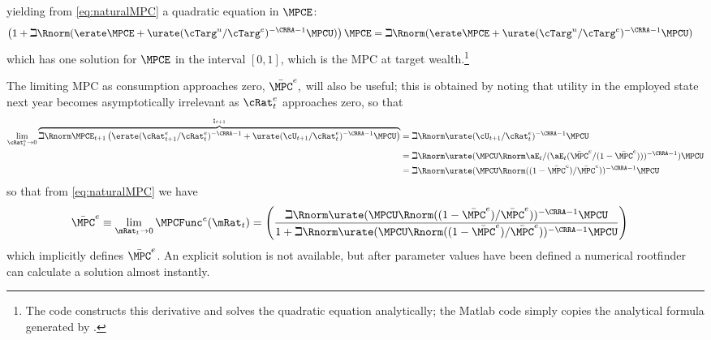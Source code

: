 \documentclass{\handout}
\begin{document}
yielding from \eqref{eq:naturalMPC} a quadratic equation in $\MPCE$:
\begin{equation}\begin{gathered}\begin{aligned}
  \left(1+\beth \Rnorm (\erate \MPCE + \urate (\cTarg^{u}/\cTarg^{e})^{-\CRRA-1}  \MPCU) \right)\MPCE & =  \beth \Rnorm (\erate \MPCE + \urate (\cTarg^{u}/\cTarg^{e})^{-\CRRA-1} \MPCU) \label{eq:quadraticForTargetMPC}
\end{aligned}\end{gathered}\end{equation} 
which has one solution for $\MPCE$ in the interval $[0,1]$, which is the MPC at target wealth.\footnote{The 
\Mma code constructs this derivative and solves the quadratic equation analytically; the Matlab code simply copies
the analytical formula generated by \Mma.}

The limiting MPC as consumption approaches zero, $\bar{\MPC}^{e},$ will also be useful; this is obtained
by noting that utility in the employed state next year becomes asymptotically irrelevant as ${\cRat}^{e}_{t}$ approaches zero, so that 
\begin{equation*}\begin{gathered}\begin{aligned}
  \lim_{{\cRat}^{e}_{t} \rightarrow 0}  \overbrace{ \beth \Rnorm \MPCE_{t+1} \left(\erate ({\cRat}^{e}_{t+1}/{\cRat}^{e}_{t})^{-\CRRA-1}  + \urate (\cU_{t+1}/{\cRat}^{e}_{t})^{-\CRRA-1}\MPCU\right)}^{\natural_{t+1}} & =  \beth \Rnorm \urate (\cU_{t+1}/{\cRat}^{e}_{t})^{-\CRRA-1}\MPCU
\\  & =  \beth \Rnorm \urate (\MPCU \Rnorm \aE_{t}/(\aE_{t}(\bar{\MPC}^{e}/(1-\bar{\MPC}^{e})))^{-\CRRA-1})\MPCU
\\ & =  \beth \Rnorm \urate (\MPCU \Rnorm ((1-\bar{\MPC}^{e})/\bar{\MPC}^{e}))^{-\CRRA-1}\MPCU
\end{aligned}\end{gathered}\end{equation*}
so that from \eqref{eq:naturalMPC} we have 
\begin{equation}\begin{gathered}\begin{aligned}
  \bar{\MPC}^{e} \equiv \lim_{\mRat_{t} \rightarrow 0} \MPCFunc^{e}(\mRat_{t}) & =  \left(\frac{
\beth \Rnorm \urate (\MPCU \Rnorm ((1-\bar{\MPC}^{e})/\bar{\MPC}^{e}))^{-\CRRA-1}\MPCU
}{1+
\beth \Rnorm \urate (\MPCU \Rnorm ((1-\bar{\MPC}^{e})/\bar{\MPC}^{e}))^{-\CRRA-1}\MPCU
}\right) \label{eq:MPCat0}
\end{aligned}\end{gathered}\end{equation}
which implicitly defines $\bar{\MPC}^{e}$.  An explicit solution is not available, but after 
parameter values have been defined a numerical rootfinder can calculate a solution almost instantly. 
\end{document}
